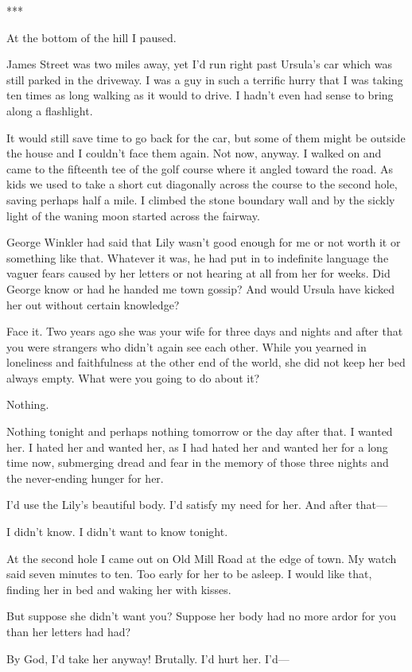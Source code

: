 {***

At the bottom of the hill I paused.

James Street was two miles away, yet I’d run right past Ursula’s car which was still parked in the driveway. I was a guy in such a terrific hurry that I was taking ten times as long walking as it would to drive. I hadn’t even had sense to bring along a flashlight.

It would still save time to go back for the car, but some of them might be outside the house and I couldn’t face them again. Not now, anyway. I walked on and came to the fifteenth tee of the golf course where it angled toward the road. As kids we used to take a short cut diagonally across the course to the second hole, saving perhaps half a mile. I climbed the stone boundary wall and by the sickly light of the waning moon started across the fairway.

George Winkler had said that Lily wasn’t good enough for me or not worth it or something like that. Whatever it was, he had put in to indefinite language the vaguer fears caused by her letters or not hearing at all from her for weeks. Did George know or had he handed me town gossip? And would Ursula have kicked her out without certain knowledge?

Face it. Two years ago she was your wife for three days and nights and after that you were strangers who didn’t again see each other. While you yearned in loneliness and faithfulness at the other end of the world, she did not keep her bed always empty. What were you going to do about it?

Nothing.

Nothing tonight and perhaps nothing tomorrow or the day after that. I wanted her. I hated her and wanted her, as I had hated her and wanted her for a long time now, submerging dread and fear in the memory of those three nights and the never-ending hunger for her.

I’d use the Lily’s beautiful body. I’d satisfy my need for her. And after that—

I didn’t know. I didn’t want to know tonight.

At the second hole I came out on Old Mill Road at the edge of town. My watch said seven minutes to ten. Too early for her to be asleep. I would like that, finding her in bed and waking her with kisses.

But suppose she didn’t want you? Suppose her body had no more ardor for you than her letters had had?

By God, I’d take her anyway! Brutally. I’d hurt her. I’d—

}
